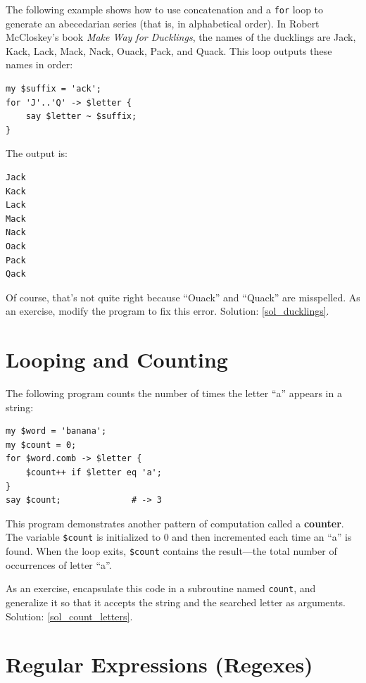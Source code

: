 The following example shows how to use concatenation and a 
{\tt for} loop to generate an abecedarian series (that is, in
alphabetical order).  In Robert McCloskey's book {\em Make
Way for Ducklings}, the names of the ducklings are Jack, Kack, Lack,
Mack, Nack, Ouack, Pack, and Quack.  This loop outputs these names in
order:

\begin{verbatim}
my $suffix = 'ack';
for 'J'..'Q' -> $letter {
    say $letter ~ $suffix;
}
\end{verbatim}
%
The output is:

\begin{verbatim}
Jack
Kack
Lack
Mack
Nack
Oack
Pack
Qack
\end{verbatim}
%
Of course, that's not quite right because ``Ouack'' and 
``Quack'' are misspelled.  As an exercise, modify the program 
to fix this error. Solution: \ref{sol_ducklings}.


\section{Looping and Counting}
\label{counter}

The following program counts the number of times the 
letter ``a'' appears in a string:

\begin{verbatim}
my $word = 'banana';
my $count = 0;
for $word.comb -> $letter {
    $count++ if $letter eq 'a';
}
say $count;              # -> 3
\end{verbatim}
%

This program demonstrates another pattern of computation called a {\bf
counter}.  The variable \verb'$count' is initialized to 0 and then
incremented each time an ``a'' is found. When the loop exits, 
\verb'$count' contains the result---the total number of 
occurrences of letter ``a''.

As an exercise, encapsulate this code in a subroutine named 
{\tt count}, and generalize it so that it accepts the string
and the searched letter as arguments. Solution: \ref{sol_count_letters}.
\label{count_letters}

\section{Regular Expressions (Regexes)}
\label{regex}

